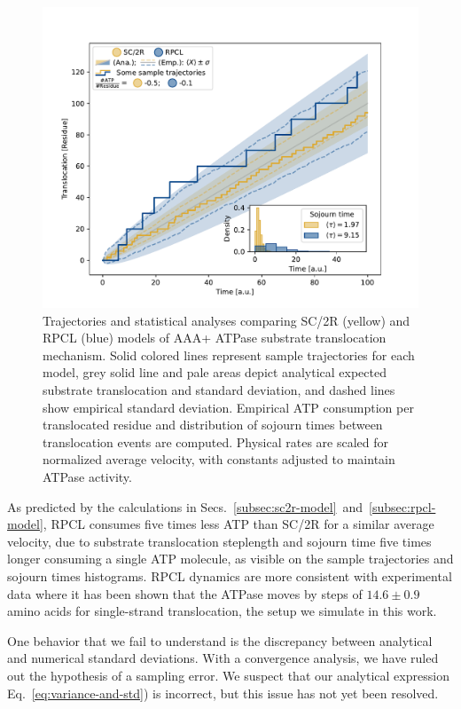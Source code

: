     \begin{figure}[h]
    \centering
    \includegraphics[width=\textwidth]{images/trajectories.pdf}
    \caption{Trajectories and statistical analyses comparing SC/2R (yellow) and RPCL (blue) models of AAA+ ATPase substrate translocation mechanism. Solid colored lines represent sample trajectories for each model, grey solid line and pale areas depict analytical expected substrate translocation and standard deviation, and dashed lines show empirical standard deviation. Empirical ATP consumption per translocated residue and distribution of sojourn times between translocation events are computed. Physical rates are scaled for normalized average velocity, with constants adjusted to maintain ATPase activity.}
    \label{fig:trajectories}
    \end{figure}
    
    As predicted by the calculations in Secs.~\ref{subsec:sc2r-model}~and~\ref{subsec:rpcl-model}, RPCL consumes five times less ATP than SC/2R for a similar average velocity, due to substrate translocation steplength and sojourn time five times longer consuming a single ATP molecule, as visible on the sample trajectories and sojourn times histograms. RPCL dynamics are more consistent with experimental data where it has been shown that the ATPase moves by steps of $14.6\pm 0.9$ amino acids for single-strand translocation\cite{avellaneda_processive_2020}, the setup we simulate in this work.
    
    One behavior that we fail to understand is the discrepancy between analytical and numerical standard deviations. With a convergence analysis, we have ruled out the hypothesis of a sampling error. We suspect that our analytical expression Eq.~\eqref{eq:variance-and-std}) is incorrect, but this issue has not yet been resolved.

